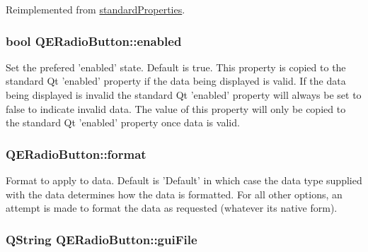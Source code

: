 Reimplemented from \hyperlink{classstandardProperties}{standardProperties}.

\hypertarget{classQERadioButton_a4d5d822fbcbc310e5e126aad54e49cdd}{
\subsubsection[{enabled}]{\setlength{\rightskip}{0pt plus 5cm}bool QERadioButton::enabled}}
\label{classQERadioButton_a4d5d822fbcbc310e5e126aad54e49cdd}
Set the prefered 'enabled' state. Default is true. This property is copied to the standard Qt 'enabled' property if the data being displayed is valid. If the data being displayed is invalid the standard Qt 'enabled' property will always be set to false to indicate invalid data. The value of this property will only be copied to the standard Qt 'enabled' property once data is valid. \hypertarget{classQERadioButton_abcf8ce7d1c1ee9d6c99423ea3b2fc69c}{
\subsubsection[{format}]{ QERadioButton::format}}
\label{classQERadioButton_abcf8ce7d1c1ee9d6c99423ea3b2fc69c}
Format to apply to data. Default is 'Default' in which case the data type supplied with the data determines how the data is formatted. For all other options, an attempt is made to format the data as requested (whatever its native form). \hypertarget{classQERadioButton_ad29930595b0e32554faaaf0c56d2d2e5}{
\subsubsection[{guiFile}]{\setlength{\rightskip}{0pt plus 5cm}QString QERadioButton::guiFile}}
\label{classQERadioButton_ad29930595b0e32554faaaf0c56d2d2e5}
